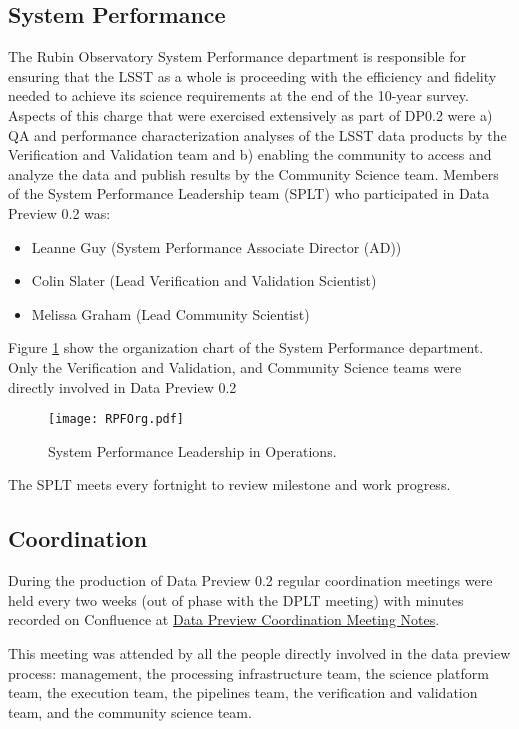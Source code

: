 \subsection{System Performance}
The Rubin Observatory System Performance department is responsible for ensuring that the LSST as a whole is proceeding with the efficiency and fidelity needed to achieve its science requirements at the end of the 10-year survey. 
Aspects of this charge that were exercised extensively as part of DP0.2 were a) QA and performance characterization analyses of the LSST data products by the Verification and Validation team and b) enabling the community to access and analyze the data and publish results by the Community Science team.
Members of the System Performance Leadership team (SPLT) who participated in Data Preview 0.2 was:
\begin{itemize}
\item Leanne Guy (System Performance Associate Director (AD))
\item Colin Slater (Lead Verification and Validation Scientist)
\item Melissa Graham (Lead Community Scientist)
\end{itemize}

Figure \ref{fig:RPFOrg} show the organization chart of the System Performance department. 
Only the Verification and Validation, and Community Science teams were directly involved in Data Preview 0.2
\begin{figure}
\texttt{[image: RPFOrg.pdf]}
\caption{System Performance Leadership in Operations.  \label{fig:RPFOrg}}
\end{figure}
The SPLT meets every fortnight to review milestone and work progress. 

\subsection{Coordination}

During the production of Data Preview 0.2 regular coordination meetings were held every two weeks (out of phase with the DPLT meeting) with minutes recorded on Confluence at \href{https://confluence.lsstcorp.org/display/LSSTOps/Data+Preview+Coordination+Meeting+Notes}{Data Preview Coordination Meeting Notes}.

This meeting was attended by all the people directly involved in the data preview process: management, the processing infrastructure team, the science platform team, the execution team, the pipelines team, the verification and validation team, and the community science team.

